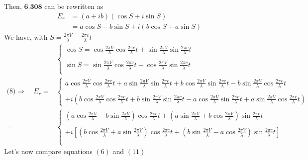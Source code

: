 Then, $\textbf{6.308}$ can be rewritten as
\begin{align}
E^{}_r &= \left(a+ib\right)\left(\cos S+i\sin S\right)\\
&= a\cos S-b\sin S+i\left(b\cos S+a\sin S\right)
\end{align}
We have, with $S= \frac{2\pi V}{\lambda}-\frac{2\pi c}{\lambda}t$
\begin{align}
&\left\{\begin{array}{l}
\cos S= \cos \frac{2\pi V}{\lambda}\cos \frac{2\pi c}{\lambda}t+\sin \frac{2\pi V}{\lambda}\sin \frac{2\pi c}{\lambda}t\\\\
\sin S= \sin \frac{2\pi V}{\lambda}\cos \frac{2\pi c}{\lambda}t-\cos \frac{2\pi V}{\lambda}\sin\frac{2\pi c}{\lambda}t\\
\end{array}\right.\\
\text{(8)}\Rightarrow \quad E^{}_r =& \left\{\begin{array}{l}a\cos \frac{2\pi V}{\lambda}\cos \frac{2\pi c}{\lambda}t+a\sin \frac{2\pi V}{\lambda}\sin \frac{2\pi c}{\lambda}t+b\cos \frac{2\pi V}{\lambda}\sin \frac{2\pi c}{\lambda}t-b\sin \frac{2\pi V}{\lambda}\cos \frac{2\pi c}{\lambda}t\\\\
+i\left(
b\cos \frac{2\pi V}{\lambda}\cos \frac{2\pi c}{\lambda}t+b\sin \frac{2\pi V}{\lambda}\sin \frac{2\pi c}{\lambda}t - a\cos \frac{2\pi V}{\lambda}\sin \frac{2\pi c}{\lambda}t+a\sin \frac{2\pi V}{\lambda}\cos \frac{2\pi c}{\lambda}t
\right)
\end{array}\right.\\
=& \left\{\begin{array}{l}\left(a\cos \frac{2\pi V}{\lambda}-b\sin \frac{2\pi V}{\lambda}\right)\cos \frac{2\pi c}{\lambda}t+\left(a\sin \frac{2\pi V}{\lambda}+b\cos \frac{2\pi V}{\lambda}\right)\sin \frac{2\pi c}{\lambda}t\\\\
+i\left[
\left(b\cos \frac{2\pi V}{\lambda}+a\sin \frac{2\pi V}{\lambda}\right)\cos \frac{2\pi c}{\lambda}t+\left(b\sin \frac{2\pi V}{\lambda} - a\cos \frac{2\pi V}{\lambda}\right)\sin \frac{2\pi c}{\lambda}t
\right]\\\\
\end{array}\right.
\end{align}
Let's now compare equations $(6)$ and $(11)$
